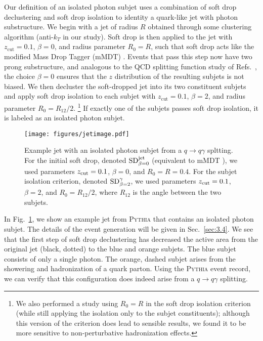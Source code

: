 \documentclass[a4paper,11pt]{article}
\DeclareRobustCommand{\Sec}[1]{Sec.~\ref{#1}}
\DeclareRobustCommand{\Fig}[1]{Fig.~\ref{#1}}
\DeclareRobustCommand{\Refs}[1]{Refs.~\cite{#1}}
\begin{document}
Our definition of an isolated photon subjet uses a combination of soft drop declustering and soft drop isolation to identity a quark-like jet with photon substructure.
%
We begin with a jet of radius $R$ obtained through some clustering algorithm (anti-$k_T$ in our study). 
%
Soft drop is then applied to the jet with $z_{\text{cut}} = 0.1$, $\beta = 0$, and radius parameter $R_0 = R$, such that soft drop acts like the modified Mass Drop Tagger (mMDT) \cite{Dasgupta:2013ihk}.
%
Events that pass this step now have two prong substructure, and analogous to the QCD splitting function study of \Refs{Larkoski:2015lea,Larkoski:2017bvj}, the choice $\beta = 0$ ensures that the $z$ distribution of the resulting subjets is not biased. 
%
We then decluster the soft-dropped jet into its two constituent subjets and apply soft drop isolation to each subjet with $z_{\text{cut}} = 0.1$, $\beta = 2$, and radius parameter $R_0 = R_{12}/2$.%
%
\footnote{We also performed a study using $R_0 = R$ in the soft drop isolation criterion (while still applying the isolation only to the subjet constituents); although this version of the criterion does lead to sensible results, we found it to be more sensitive to non-perturbative hadronization effects.}
%
If exactly one of the subjets passes soft drop isolation, it is labeled as an isolated photon subjet.

\begin{figure}[t]
	\hspace{3.2cm}
    \texttt{[image: figures/jetimage.pdf]}
    \caption{Example jet with an isolated photon subjet from a $q \rightarrow q \gamma$ spltting. For the initial soft drop, denoted $\rm{SD}^{\rm jet}_{\beta = 0}$ (equivalent to mMDT \cite{Dasgupta:2013ihk}), we used parameters $z_{\rm cut} = 0.1$, $\beta = 0$, and $R_0 = R = 0.4$. For the subjet isolation criterion, denoted $\rm{SD}^{\gamma}_{\beta = 2}$, we used parameters $z_{\rm cut} = 0.1$, $\beta = 2$, and $R_0 = R_{12}/2$, where $R_{12}$ is the angle between the two subjets.}
    \label{fig:jetimage}
\end{figure}

In \Fig{fig:jetimage}, we show an example jet from \textsc{Pythia} that contains an isolated photon subjet.
%
The details of the event generation will be given in \Sec{sec:3.4}.
%
We see that the first step of soft drop declustering has decreased the active area \cite{Cacciari:2008gn} from the original jet (black, dotted) to the blue and orange subjets.
%
The blue subjet consists of only a single photon.
%
The orange, dashed subjet arises from the showering and hadronization of a quark parton.
%
Using the \textsc{Pythia} event record, we can verify that this configuration does indeed arise from a $q \rightarrow q \gamma$ splitting.
\end{document}
